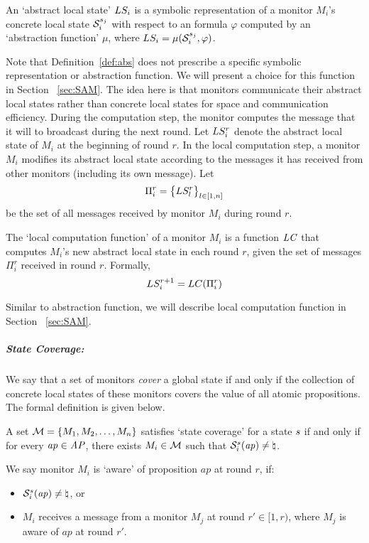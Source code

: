 \begin{definition}
\label{def:abs}
An `abstract local state' $LS_i$ is a symbolic representation of a 
monitor $M_i$'s concrete local state $\mathcal{S}_i^{s_j}$ with respect to an \LTL formula 
$\varphi$ computed by an `abstraction function' $\mu$, where $LS_i = \mu 
(\mathcal{S}_i^{s_j}, \varphi)$.
\end{definition}

Note that Definition~\ref{def:abs} does not prescribe a specific symbolic 
representation or abstraction function. We will present a choice for this 
function in Section ~\ref{sec:SAM}. The idea here is that monitors communicate 
their abstract local states rather than concrete local states for space and 
communication efficiency. During the computation step, the monitor computes the 
message that it will to broadcast during the next round. Let $LS_i^r$ 
denote the abstract local state of $M_i$ at the beginning of round $r$. In the 
local computation step, a monitor $M_i$ modifies its abstract local state 
according to the messages it has received from other monitors (including its own 
message). Let
$$\Pi_i^r = \big\{ LS_l^r\big\}_{l \in [1, n]}$$
be the set of all messages received by monitor $M_i$ during round $r$. 

\begin{definition}
The `local computation function' of a monitor $M_i$ is a function $\mathit{LC}$ 
that computes $M_i$'s new abstract local state in each round $r$, given the set 
of messages $\Pi_i^r$ received in round $r$. Formally,
$$LS_i^{r+1} = LC(\Pi_i^r)$$
\end{definition}

Similar to abstraction function, we will describe local computation 
function in Section ~\ref{sec:SAM}. 

\subparagraph{State Coverage:}  We say that a set of monitors \emph{cover} a 
global state if and only if the collection of concrete local states of these 
monitors covers the value of all atomic propositions. The formal definition 
is given below.

\begin{definition}
\label{def:state coverage}
A set $\mathcal{M} = \{M_1, M_2, \dots, M_n\}$ satisfies `state coverage' for 
a state $s$ if and only if for every $\mathit{ap} \in \mathit{AP}$, there exists $M_i\in 
\mathcal{M}$ such that $\mathcal{S}_i^s(\mathit{ap}) \neq \natural$.
\end{definition}

\begin{definition}
We say monitor $M_i$ is `aware' of proposition $ap$ at round $r$, if: 

\begin{itemize}
\item $\mathcal{S}_i^s(\mathit{ap}) \neq \natural$, or 
\item $M_i$ receives a message from a monitor $M_j$ at round $r' \in [1,r)$, 
where $M_j$ is aware of $ap$ at round $r'$. 
\end{itemize}

\end{definition}


